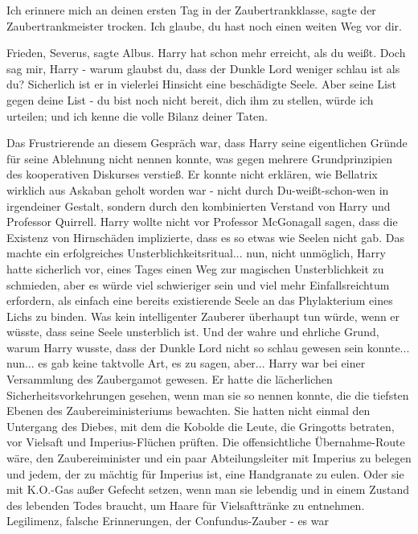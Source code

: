 \glqq Ich erinnere mich an deinen ersten Tag in der Zaubertrankklasse\grqq{},
sagte der Zaubertrankmeister trocken. \glqq Ich glaube, du hast noch einen
weiten Weg vor dir.\grqq{}

\glqq Frieden, Severus\grqq{}, sagte Albus. \glqq Harry hat schon mehr erreicht,
als du weißt. Doch sag mir, Harry - warum glaubst du, dass der Dunkle Lord
weniger schlau ist als du? Sicherlich ist er in vielerlei Hinsicht eine
beschädigte Seele. Aber seine List gegen deine List - du bist noch nicht bereit,
dich ihm zu stellen, würde ich urteilen; und ich kenne die volle Bilanz deiner
Taten.\grqq{}

Das Frustrierende an diesem Gespräch war, dass Harry seine eigentlichen Gründe
für seine Ablehnung nicht nennen konnte, was gegen mehrere Grundprinzipien des
kooperativen Diskurses verstieß. Er konnte nicht erklären, wie Bellatrix
wirklich aus Askaban geholt worden war - nicht durch Du-weißt-schon-wen in
irgendeiner Gestalt, sondern durch den kombinierten Verstand von Harry und
Professor Quirrell. Harry wollte nicht vor Professor McGonagall sagen, dass die
Existenz von Hirnschäden implizierte, dass es so etwas wie Seelen nicht gab. Das
machte ein erfolgreiches Unsterblichkeitsritual... nun, nicht unmöglich, Harry
hatte sicherlich vor, eines Tages einen Weg zur magischen Unsterblichkeit zu
schmieden, aber es würde viel schwieriger sein und viel mehr Einfallsreichtum
erfordern, als einfach eine bereits existierende Seele an das Phylakterium eines
Lichs zu binden. Was kein intelligenter Zauberer überhaupt tun würde, wenn er
wüsste, dass seine Seele unsterblich ist. Und der wahre und ehrliche Grund,
warum Harry wusste, dass der Dunkle Lord nicht so schlau gewesen sein konnte...
nun... es gab keine taktvolle Art, es zu sagen, aber... Harry war bei einer
Versammlung des Zaubergamot gewesen. Er hatte die lächerlichen \glqq
Sicherheitsvorkehrungen\grqq{} gesehen, wenn man sie so nennen konnte, die die
tiefsten Ebenen des Zaubereiministeriums bewachten. Sie hatten nicht einmal den
\glqq Untergang des Diebes\grqq{}, mit dem die Kobolde die Leute, die Gringotts
betraten, vor Vielsaft und Imperius-Flüchen prüften. Die offensichtliche
Übernahme-Route wäre, den Zaubereiminister und ein paar Abteilungsleiter mit
Imperius zu belegen und jedem, der zu mächtig für Imperius ist, eine Handgranate
zu eulen. Oder sie mit K.O.-Gas außer Gefecht setzen, wenn man sie lebendig und
in einem Zustand des lebenden Todes braucht, um Haare für Vielsafttränke zu
entnehmen. Legilimenz, falsche Erinnerungen, der Confundus-Zauber - es war
